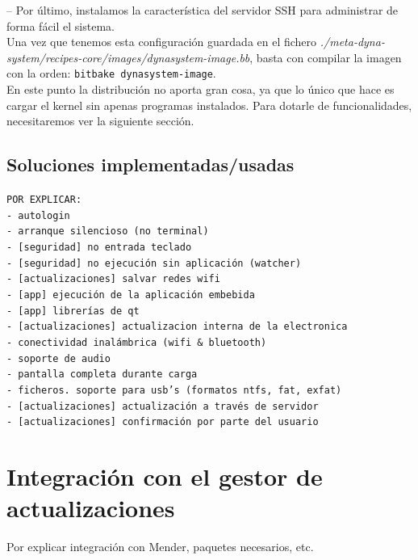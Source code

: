 -- Por último, instalamos la característica del servidor SSH para administrar de forma fácil el sistema.\\

Una vez que tenemos esta configuración guardada en el fichero \textit{./meta-dyna-system/recipes-core/images/dynasystem-image.bb}, basta con compilar la imagen con la orden: \texttt{bitbake dynasystem-image}.\\

En este punto la distribución no aporta gran cosa, ya que lo único que hace es cargar el kernel sin apenas programas instalados. Para dotarle de funcionalidades, necesitaremos ver la siguiente sección.

\subsection{Soluciones implementadas/usadas}

\texttt{POR EXPLICAR:\\
	- autologin\\
	- arranque silencioso (no terminal)\\
	- [seguridad] no entrada teclado\\
	- [seguridad] no ejecución sin aplicación (watcher)\\
	- [actualizaciones] salvar redes wifi\\
	- [app] ejecución de la aplicación embebida\\
	- [app] librerías de qt\\
	- [actualizaciones] actualizacion interna de la electronica\\
	- conectividad inalámbrica (wifi \& bluetooth)\\
	- soporte de audio\\
	- pantalla completa durante carga\\
	- ficheros. soporte para usb's (formatos ntfs, fat, exfat)\\
	- [actualizaciones] actualización a través de servidor\\
	- [actualizaciones] confirmación por parte del usuario}\\

\section{Integración con el gestor de actualizaciones}

Por explicar integración con Mender, paquetes necesarios, etc.

\newpage